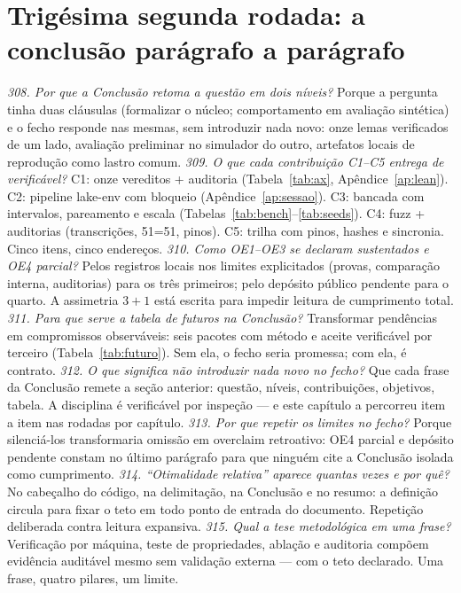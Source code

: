 \section{Trigésima segunda rodada: a conclusão parágrafo a parágrafo}
\textit{308. Por que a Conclusão retoma a questão em dois níveis?} Porque a pergunta tinha duas cláusulas (formalizar o núcleo; comportamento em avaliação sintética) e o fecho responde nas mesmas, sem introduzir nada novo: onze lemas verificados de um lado, avaliação preliminar no simulador do outro, artefatos locais de reprodução como lastro comum.
\textit{309. O que cada contribuição C1--C5 entrega de verificável?} C1: onze vereditos + auditoria (Tabela~\ref{tab:ax}, Apêndice~\ref{ap:lean}). C2: pipeline lake-env com bloqueio (Apêndice~\ref{ap:sessao}). C3: bancada com intervalos, pareamento e escala (Tabelas~\ref{tab:bench}--\ref{tab:seeds}). C4: fuzz + auditorias (transcrições, 51=51, pinos). C5: trilha com pinos, hashes e sincronia. Cinco itens, cinco endereços.
\textit{310. Como OE1--OE3 se declaram sustentados e OE4 parcial?} Pelos registros locais nos limites explicitados (provas, comparação interna, auditorias) para os três primeiros; pelo depósito público pendente para o quarto. A assimetria $3+1$ está escrita para impedir leitura de cumprimento total.
\textit{311. Para que serve a tabela de futuros na Conclusão?} Transformar pendências em compromissos observáveis: seis pacotes com método e aceite verificável por terceiro (Tabela~\ref{tab:futuro}). Sem ela, o fecho seria promessa; com ela, é contrato.
\textit{312. O que significa não introduzir nada novo no fecho?} Que cada frase da Conclusão remete a seção anterior: questão, níveis, contribuições, objetivos, tabela. A disciplina é verificável por inspeção --- e este capítulo a percorreu item a item nas rodadas por capítulo.
\textit{313. Por que repetir os limites no fecho?} Porque silenciá-los transformaria omissão em overclaim retroativo: OE4 parcial e depósito pendente constam no último parágrafo para que ninguém cite a Conclusão isolada como cumprimento.
\textit{314. ``Otimalidade relativa'' aparece quantas vezes e por quê?} No cabeçalho do código, na delimitação, na Conclusão e no resumo: a definição circula para fixar o teto em todo ponto de entrada do documento. Repetição deliberada contra leitura expansiva.
\textit{315. Qual a tese metodológica em uma frase?} Verificação por máquina, teste de propriedades, ablação e auditoria compõem evidência auditável mesmo sem validação externa --- com o teto declarado. Uma frase, quatro pilares, um limite.

